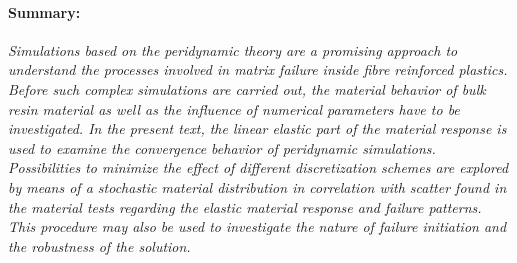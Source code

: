 
\paragraph{Summary:} \textit{Simulations based on the peridynamic theory are a promising approach to understand the processes involved in matrix failure inside fibre reinforced plastics. Before such complex simulations are carried out, the material behavior of bulk resin material as well as the influence of numerical parameters have to be investigated. In the present text, the linear elastic part of the material response is used to examine the convergence behavior of peridynamic simulations. Possibilities to minimize the effect of different discretization schemes are explored by means of a stochastic material distribution in correlation with scatter found in the material tests regarding the elastic material response and failure patterns. This procedure may also be used to investigate the nature of failure initiation and the robustness of the solution.}